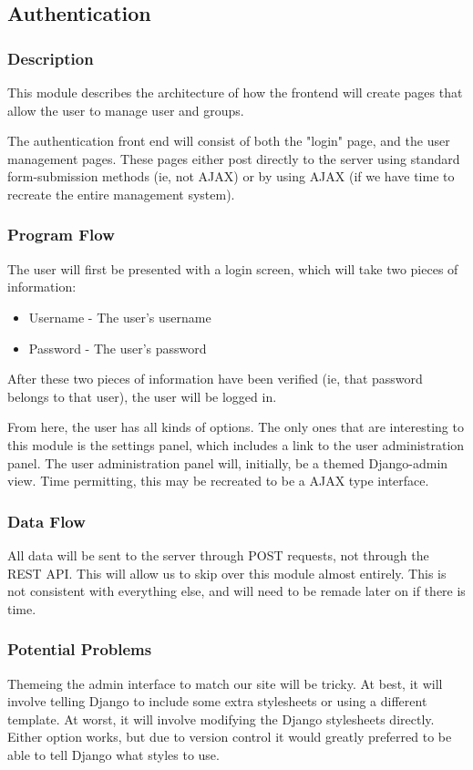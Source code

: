 
\subsection{Authentication}

\subsubsection{Description}

This module describes the architecture of how the frontend will create pages that allow the user to manage user and groups.

The authentication front end will consist of both the "login" page, and the user management pages.
These pages either post directly to the server using standard form-submission methods (ie, not \ac{AJAX}) or by using \ac{AJAX} (if we have time to recreate the entire management system).

\subsubsection{Program Flow}

The user will first be presented with a login screen, which will take two pieces of information:
\begin{itemize}
 \item Username - The user's username
 \item Password - The user's password
\end{itemize}

After these two pieces of information have been verified (ie, that password belongs to that user), the user will be logged in.

From here, the user has all kinds of options.
The only ones that are interesting to this module is the settings panel, which includes a link to the user administration panel.
The user administration panel will, initially, be a themed Django-admin view.
Time permitting, this may be recreated to be a \ac{AJAX} type interface.

\subsubsection{Data Flow}

All data will be sent to the server through \ac{POST} requests, not through the \ac{REST} \ac{API}.
This will allow us to skip over this module almost entirely.
This is not consistent with everything else, and will need to be remade later on if there is time.

\subsubsection{Potential Problems}

Themeing the admin interface to match our site will be tricky.
At best, it will involve telling Django to include some extra stylesheets or using a different template.
At worst, it will involve modifying the Django stylesheets directly.
Either option works, but due to version control it would greatly preferred to be able to tell Django what styles to use.
